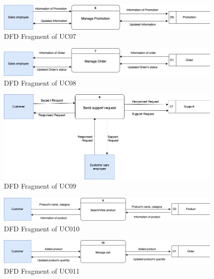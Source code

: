 \begin{figure}[H]
  \centering
  \includegraphics[width=1.1\textwidth]{DFD-UC07.png}
  \caption{DFD Fragment of UC07}
  \label{fig:dfd-uc07}
\end{figure}

\begin{figure}[H]
  \centering
  \includegraphics[width=1.1\textwidth]{DFD-UC08.png}
  \caption{DFD Fragment of UC08}
  \label{fig:dfd-uc08}
\end{figure}

\begin{figure}[H]
  \centering
  \includegraphics[width=1.1\textwidth]{DFD-UC09.png}
  \caption{DFD Fragment of UC09}
  \label{fig:dfd-uc09}
\end{figure}

\begin{figure}[H]
  \centering
  \includegraphics[width=1.1\textwidth]{DFD-UC10.png}
  \caption{DFD Fragment of UC010}
  \label{fig:dfd-uc010}
\end{figure}

\begin{figure}[H]
  \centering
  \includegraphics[width=1.1\textwidth]{DFD-UC11.png}
  \caption{DFD Fragment of UC011}
  \label{fig:dfd-uc011}
\end{figure}

